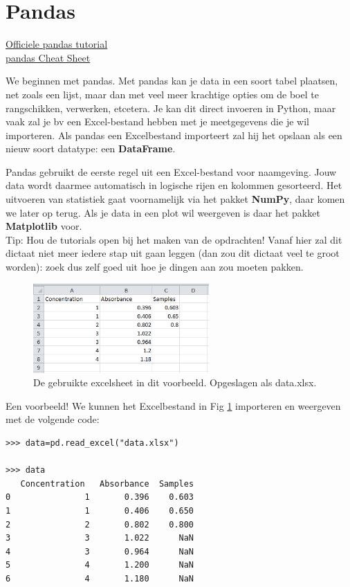 \section{Pandas}
\href{http://pandas.pydata.org/pandas-docs/stable/10min.html}{Officiele pandas tutorial}\\
\href{http://pandas.pydata.org/Pandas_Cheat_Sheet.pdf}{pandas Cheat Sheet}

We beginnen met pandas. Met pandas kan je data in een soort tabel plaatsen, net zoals een lijst, maar dan met veel meer krachtige opties om de boel te rangschikken, verwerken, etcetera. Je kan dit direct invoeren in Python, maar vaak zal je bv een Excel-bestand hebben met je meetgegevens die je wil importeren. Als pandas een Excelbestand importeert zal hij het opslaan als een nieuw soort datatype: een \textbf{DataFrame}. 

Pandas gebruikt de eerste regel uit een Excel-bestand voor naamgeving. Jouw data wordt daarmee automatisch in logische rijen en kolommen gesorteerd. Het uitvoeren van statistiek gaat voornamelijk via het pakket \textbf{NumPy}, daar komen we later op terug. Als je data in een plot wil weergeven is daar het pakket \textbf{Matplotlib} voor. 
\\ Tip: Hou de tutorials open bij het maken van de opdrachten! Vanaf hier zal dit dictaat niet meer iedere stap uit gaan leggen (dan zou dit dictaat veel te groot worden): zoek dus zelf goed uit hoe je dingen aan zou moeten pakken.

\begin{figure}[h]
\begin{center}
\includegraphics[width=0.6\textwidth]{img/excelscreen.PNG}
\caption{\label{fig:excel} De gebruikte excelsheet in dit voorbeeld. Opgeslagen als data.xlsx. }
\end{center}
\end{figure}

Een voorbeeld! We kunnen het Excelbestand in Fig \ref{fig:excel} importeren en weergeven met de volgende code:

\begin{lstlisting}[frame=single]
>>> data=pd.read_excel("data.xlsx")

>>> data
   Concentration   Absorbance  Samples
0               1       0.396    0.603
1               1       0.406    0.650
2               2       0.802    0.800
3               3       1.022      NaN
4               3       0.964      NaN
5               4       1.200      NaN
6               4       1.180      NaN
\end{lstlisting}

